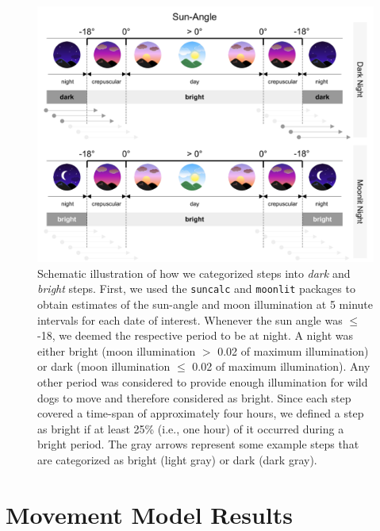 \documentclass[../FinalThesis.tex]{subfiles}
\begin{document}
\begin{figure}[htpb]
 \begin{center}
  \includegraphics[width = \textwidth]{Figures/Light.pdf}
  \caption{Schematic illustration of how we categorized steps into \textit{dark}
  and \textit{bright} steps. First, we used the \texttt{suncalc} and
  \texttt{moonlit} packages to obtain estimates of the sun-angle and moon
  illumination at 5 minute intervals for each date of interest. Whenever the sun
  angle was $\leq $ -18\degree, we deemed the respective period to be at night.
  A night was either bright (moon illumination $>$ 0.02 of maximum illumination)
  or dark (moon illumination $\leq$ 0.02 of maximum illumination). Any other
  period was considered to provide enough illumination for wild dogs to move and
  therefore considered as bright. Since each step covered a time-span of
  approximately four hours, we defined a step as bright if at least 25\% (i.e.,
  one hour) of it occurred during a bright period. The gray arrows represent
  some example steps that are categorized as bright (light gray) or dark (dark
  gray).}
  \label{Light}
 \end{center}
\end{figure}

\newpage
\section{Movement Model Results}
\end{document}
